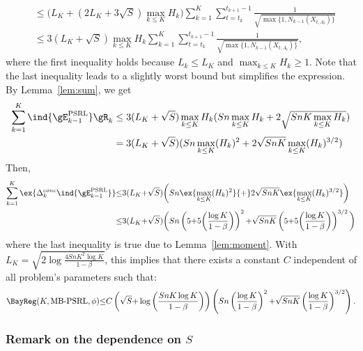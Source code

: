 \begin{subappendices}
\begin{align}
    &\le  \big(L_K {+}(2L_K {+}3\sqrt{S})\max_{k\le K}H_k\big)\sum_{k=1}^K \sum_{t=t_k}^{t_{k+1}-1}\frac1{\sqrt{\max\{1,N_{k-1}(X_{t,A_t})\} }}
    \nonumber\\
    &\le  3(L_K+\sqrt{S})\max_{k\le K}H_k \sum_{k=1}^K \sum_{t=t_k}^{t_{k+1}-1}\frac1{\sqrt{\max\{1,N_{k-1}(X_{t,A_t})\} }},
    \label{eq:sum_not_E_k}
\end{align}
where the first inequality holds because $L_k\le L_K$ and $\max_{k\le K}H_k\ge1$. Note that the last inequality leads to a slightly worst bound but simplifies the expression. By Lemma~\ref{lem:sum}, we get
\begin{align*}
    \sum_{k=1}^{K} \ind{\gE_{k-1}^\text{PSRL}}\gR_k
    &\le 3(L_K+\sqrt{S})\max_{k\le K}H_k(Sn\max_{k\le K}H_k +2\sqrt{SnK \max_{k\le K}H_k}) \\
    &=3(L_K+\sqrt{S})(Sn\max_{k\le K}(H_k)^2 +2\sqrt{SnK} \max_{k\le K}(H_k)^{3/2})
    \nonumber
\end{align*}
Then, 
\begin{align}
    \sum_{k=1}^K\ex{\Delta_k^{conc} \ind{\gE_{k-1}^\text{PSRL}}}
    &{\le} 3(L_K {+}\sqrt{S})\bigg(Sn\ex{\max_{k\le K}(H_k)^2} {+}2\sqrt{SnK} \ex{\max_{k\le K}(H_k)^{3/2}}\bigg) \label{eq:proof_bound}\\
    &{\le} 3(L_K {+}\sqrt{S})\bigg(Sn\left(5 {+}5\bigg(\frac{\log K}{1-\beta}\bigg)\right)^2 {+}\sqrt{SnK}\left(5 {+}5\bigg(\frac{\log K}{1-\beta}\bigg)\right)^{3/2}\bigg) \nonumber
\end{align}
where the last inequality is true due to Lemma~\ref{lem:moment}.
With $L_K{=}\sqrt{2\log\frac{4SnK^2\log K}{1-\beta}}$, this implies that there exists a constant $C$ independent of all problem's parameters such that:
\begin{align*}
    \BayReg(K,\text{MB-PSRL},\phi) {\le} C\left(\sqrt{S}{+}\log\left(\frac{SnK\log K}{1-\beta}\right)\right) \left(Sn\left(\frac{\log K}{1-\beta}\right)^{2}
    {+}\sqrt{SnK}\left(\frac{\log K}{1-\beta}\right)^{3/2}\right).
\end{align*}

\subsubsection{Remark on the dependence on $S$}
\label{sssec:psrl_s}


\end{subappendices}
